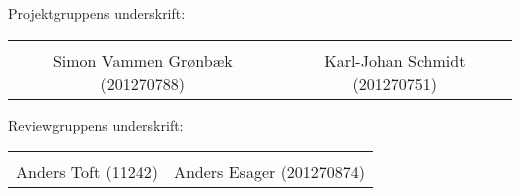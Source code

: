Projektgruppens underskrift: 
\begin{table}[H]
	\centering
	\begin{tabular}{c c}
		\underline{\phantom{mmmmmmmmmmmmmmmmmmmmm}} & \underline{\phantom{mmmmmmmmmmmmmmmmmmmmm}} \\
		Simon Vammen Grønbæk (201270788) \vspace{2cm} & Karl-Johan Schmidt (201270751) \vspace{2cm}\\
	\end{tabular}
\end{table}
Reviewgruppens underskrift:
\begin{table}[H]
	\centering
	\begin{tabular}{c c}
		\underline{\phantom{mmmmmmmmmmmmmmmmmmmmm}} & \underline{\phantom{mmmmmmmmmmmmmmmmmmmmm}} \\
		Anders Toft (11242) \vspace{2cm} & Anders Esager (201270874) \vspace{2cm}\\
	\end{tabular}
\end{table}

